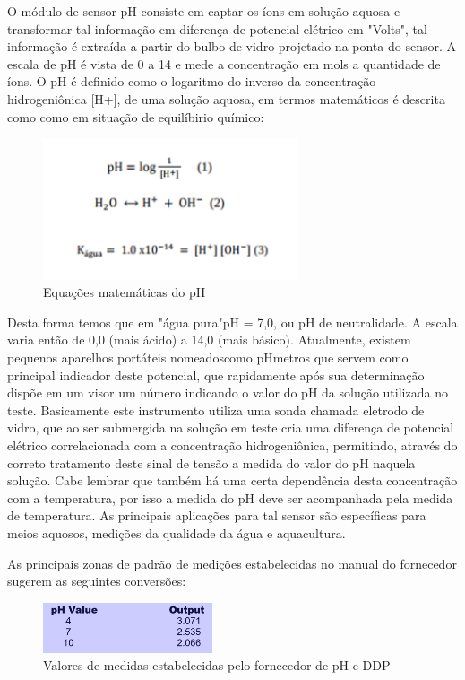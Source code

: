 O módulo de sensor pH consiste em captar os íons em solução aquosa e transformar tal informação
em diferença de potencial elétrico em "Volts", tal informação é extraída a partir do bulbo de vidro
projetado na ponta do sensor. A escala de pH é vista de 0 a 14 e mede a concentração em mols a
quantidade de íons. O pH é definido como o logaritmo do inverso da concentração hidrogeniônica
[H+], de uma solução aquosa, em termos matemáticos é descrita como como em situação de
equilíbirio químico:

\begin{figure}[H]
	\centering
	\includegraphics[width=7.5cm]{figuras/calculo_equilibrio.png}
	\caption{Equações matemáticas do pH}
	\label{calculo_equilibrio}
\end{figure}

Desta forma temos que em "água pura"pH = 7,0, ou pH de neutralidade. A escala varia
então de 0,0 (mais ácido) a 14,0 (mais básico). Atualmente, existem pequenos aparelhos portáteis
nomeadoscomo pHmetros que servem como principal indicador deste potencial, que rapidamente
após sua determinação dispõe em um visor um número indicando o valor do pH da solução
utilizada no teste. Basicamente este instrumento utiliza uma sonda chamada eletrodo de vidro, que
ao ser submergida na solução em teste cria uma diferença de potencial elétrico correlacionada com
a concentração hidrogeniônica, permitindo, através do correto tratamento deste sinal de tensão a
medida do valor do pH naquela solução. Cabe lembrar que também há uma certa dependência
desta concentração com a temperatura, por isso a medida do pH deve ser acompanhada pela
medida de temperatura\cite{atkins2011}.
As principais aplicações para tal sensor são específicas para meios aquosos, medições da
qualidade da água e aquacultura. 

As principais zonas de padrão de medições estabelecidas no
manual do fornecedor sugerem as seguintes conversões:

\begin{figure}[H]
	\centering
	\includegraphics[width=5cm]{figuras/valores_ph.png}
	\caption{Valores de medidas estabelecidas pelo fornecedor de pH e DDP}
	\label{valores_ph}
\end{figure}


